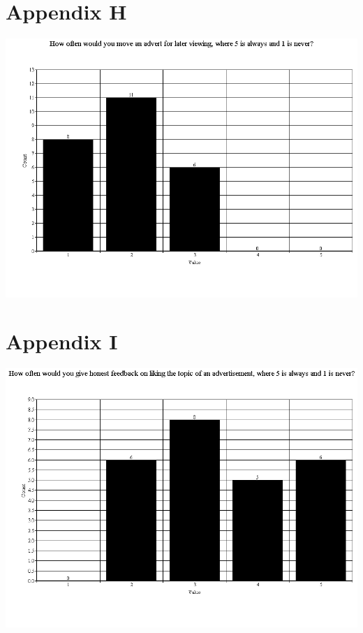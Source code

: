 \section{Appendix H}
\includegraphics[scale=0.5]{Images/q8}
\section{Appendix I}
\includegraphics[scale=0.5]{Images/q9}
